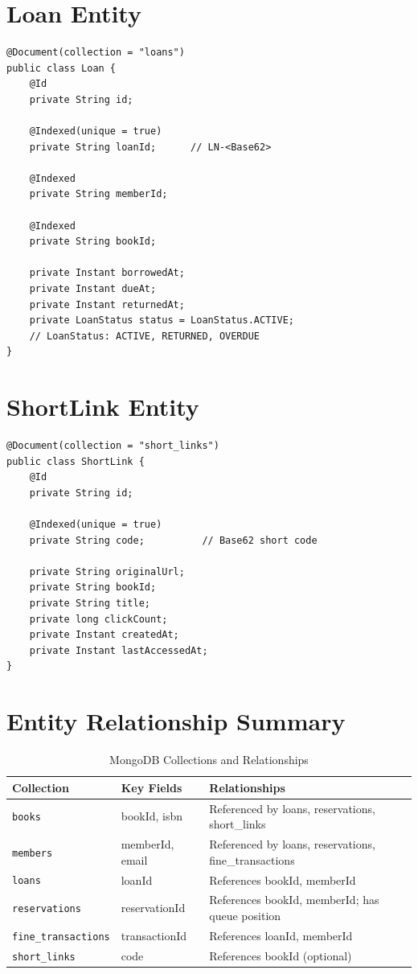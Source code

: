 \documentclass[12pt,a4paper]{report}
\begin{document}
\section{Loan Entity}
\begin{lstlisting}[style=JavaStyle, caption={Loan.java -- Book Borrowing Record}]
@Document(collection = "loans")
public class Loan {
    @Id
    private String id;

    @Indexed(unique = true)
    private String loanId;      // LN-<Base62>

    @Indexed
    private String memberId;

    @Indexed
    private String bookId;

    private Instant borrowedAt;
    private Instant dueAt;
    private Instant returnedAt;
    private LoanStatus status = LoanStatus.ACTIVE;
    // LoanStatus: ACTIVE, RETURNED, OVERDUE
}
\end{lstlisting}

\section{ShortLink Entity}
\begin{lstlisting}[style=JavaStyle, caption={ShortLink.java -- URL Shortener Document (Member 4)}]
@Document(collection = "short_links")
public class ShortLink {
    @Id
    private String id;

    @Indexed(unique = true)
    private String code;          // Base62 short code

    private String originalUrl;
    private String bookId;
    private String title;
    private long clickCount;
    private Instant createdAt;
    private Instant lastAccessedAt;
}
\end{lstlisting}

\section{Entity Relationship Summary}

\begin{table}[H]
\centering
\caption{MongoDB Collections and Relationships}
\begin{tabularx}{\textwidth}{l l X}
\toprule
\textbf{Collection} & \textbf{Key Fields} & \textbf{Relationships} \\
\midrule
\texttt{books} & bookId, isbn & Referenced by loans, reservations, short\_links \\
\texttt{members} & memberId, email & Referenced by loans, reservations, fine\_transactions \\
\texttt{loans} & loanId & References bookId, memberId \\
\texttt{reservations} & reservationId & References bookId, memberId; has queue position \\
\texttt{fine\_transactions} & transactionId & References loanId, memberId \\
\texttt{short\_links} & code & References bookId (optional) \\
\bottomrule
\end{tabularx}
\end{table}
\end{document}
